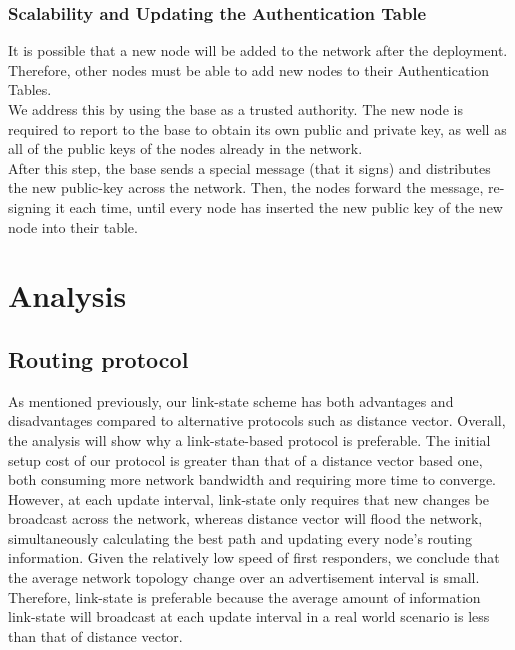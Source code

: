 \documentclass[letterpaper]{article}
\begin{document}
\subsubsection{Scalability and Updating the Authentication Table}


It is possible that a new node will be added to the network after the deployment. 
Therefore, other nodes must be able to add new nodes to their Authentication Tables.
\\

\noindent We address this by using the base as a trusted authority. The new node is required to report to the base
to obtain its own public and private key, as well as all of the public keys of the nodes already in the network.
\\

\noindent After this step, the base sends a special message (that it signs) and distributes the new public-key across the network. 
Then, the nodes forward the message, re-signing it each time, until every node has inserted the new public key of the new node into their table.

\section{Analysis}

\subsection{Routing protocol}

As mentioned previously, our link-state scheme has both advantages and disadvantages compared to alternative protocols
such as distance vector. Overall, the analysis will show why a link-state-based protocol is preferable. The initial
setup cost of our protocol is greater than that of a distance vector based one, both consuming more network bandwidth
and requiring more time to converge. However, at each update interval, link-state only requires that new changes
be broadcast across the network, whereas distance vector will flood the network, simultaneously calculating the 
best path and updating every node's routing information. Given the relatively low speed of first responders, we 
conclude that the average network topology change over an advertisement interval is small. Therefore, link-state is
preferable because the average amount of information link-state will broadcast at each update interval in a real world
scenario is less than that of distance vector.
\\
\end{document}
